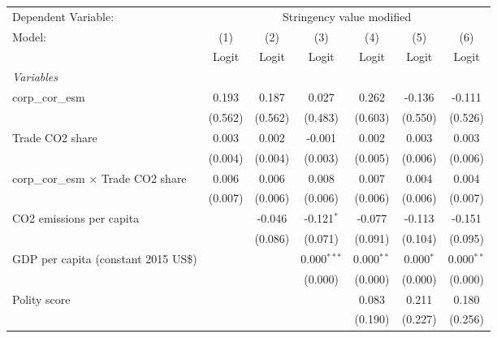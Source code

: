 
\begingroup
\centering
\begin{tabular}{lcccccc}
   \toprule
   Dependent Variable: & \multicolumn{6}{c}{Stringency value modified}\\
   Model:                                     & (1)     & (2)     & (3)           & (4)          & (5)         & (6)\\  
                                              &  Logit  & Logit   & Logit         & Logit        & Logit       & Logit\\  
   \midrule
   \emph{Variables}\\
   corp\_cor\_esm                             & 0.193   & 0.187   & 0.027         & 0.262        & -0.136      & -0.111\\   
                                              & (0.562) & (0.562) & (0.483)       & (0.603)      & (0.550)     & (0.526)\\   
   Trade CO2 share                            & 0.003   & 0.002   & -0.001        & 0.002        & 0.003       & 0.003\\   
                                              & (0.004) & (0.004) & (0.003)       & (0.005)      & (0.006)     & (0.006)\\   
   corp\_cor\_esm $\times$ Trade CO2 share    & 0.006   & 0.006   & 0.008         & 0.007        & 0.004       & 0.004\\   
                                              & (0.007) & (0.006) & (0.006)       & (0.006)      & (0.006)     & (0.007)\\   
   CO2 emissions per capita                   &         & -0.046  & -0.121$^{*}$  & -0.077       & -0.113      & -0.151\\   
                                              &         & (0.086) & (0.071)       & (0.091)      & (0.104)     & (0.095)\\   
   GDP per capita (constant 2015 US\$)        &         &         & 0.000$^{***}$ & 0.000$^{**}$ & 0.000$^{*}$ & 0.000$^{**}$\\   
                                              &         &         & (0.000)       & (0.000)      & (0.000)     & (0.000)\\   
   Polity score                               &         &         &               & 0.083        & 0.211       & 0.180\\   
                                              &         &         &               & (0.190)      & (0.227)     & (0.256)\\   

\end{tabular}
